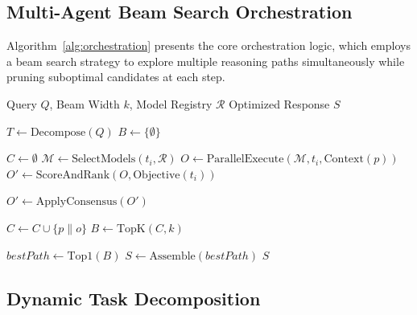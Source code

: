\subsection{Multi-Agent Beam Search Orchestration}

Algorithm~\ref{alg:orchestration} presents the core orchestration logic, which employs a beam search strategy to explore multiple reasoning paths simultaneously while pruning suboptimal candidates at each step.

\begin{algorithm}[!ht]
\caption{GAIOL Intelligent Orchestration (Multi-Agent Beam Search)}
\label{alg:orchestration}
\begin{algorithmic}[1]
\Require Query $Q$, Beam Width $k$, Model Registry $\mathcal{R}$
\Ensure Optimized Response $S$

\State $T \gets \text{Decompose}(Q)$ 
\State $B \gets \{ \emptyset \}$ 

    \State $C \gets \emptyset$ 
        \State $\mathcal{M} \gets \text{SelectModels}(t_i, \mathcal{R})$
        \State $O \gets \text{ParallelExecute}(\mathcal{M}, t_i, \text{Context}(p))$
        \State $O' \gets \text{ScoreAndRank}(O, \text{Objective}(t_i))$
        
            \State $O' \gets \text{ApplyConsensus}(O')$
        \EndIf
        
            \State $C \gets C \cup \{ p \parallel o \}$ 
        \EndFor
    \EndFor
    \State $B \gets \text{TopK}(C, k)$ 
\EndFor

\State $bestPath \gets \text{Top1}(B)$
\State $S \gets \text{Assemble}(bestPath)$
\State \Return $S$
\end{algorithmic}
\end{algorithm}

\subsection{Dynamic Task Decomposition}

